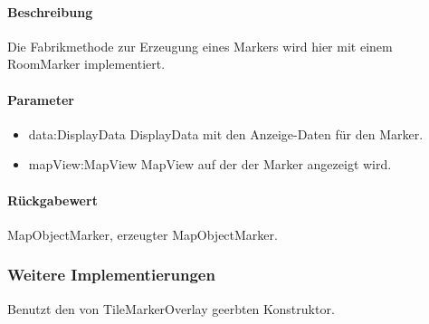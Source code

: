 \paragraph*{Beschreibung}
Die Fabrikmethode zur Erzeugung eines Markers wird hier mit einem RoomMarker implementiert.
\paragraph*{Parameter}
\begin{itemize}
    \item data:DisplayData DisplayData mit den Anzeige-Daten für den Marker.
    \item mapView:MapView MapView auf der der Marker angezeigt wird.
\end{itemize}
\paragraph*{Rückgabewert}
MapObjectMarker, erzeugter MapObjectMarker.

\subsubsection{Weitere Implementierungen}%
Benutzt den von TileMarkerOverlay geerbten Konstruktor.